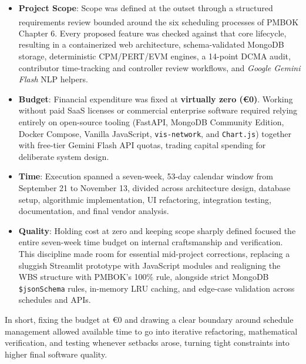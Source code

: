 \vspace{-8pt}
\begin{itemize}[itemsep=1pt,topsep=0pt,parsep=0pt,partopsep=0pt]
    \item \textbf{Project Scope}: Scope was defined at the outset through a structured requirements review bounded around the six scheduling processes of PMBOK\textsuperscript{\textregistered} Chapter 6. Every proposed feature was checked against that core lifecycle, resulting in a containerized web architecture, schema-validated MongoDB storage, deterministic CPM/PERT/EVM engines, a 14-point DCMA audit, contributor time-tracking and controller review workflows, and \textit{Google Gemini Flash} NLP helpers. 
    \item \textbf{Budget}: Financial expenditure was fixed at \textbf{virtually zero (€0)}. Working without paid SaaS licenses or commercial enterprise software required relying entirely on open-source tooling (FastAPI, MongoDB Community Edition, Docker Compose, Vanilla JavaScript, \texttt{vis-network}, and \texttt{Chart.js}) together with free-tier Gemini Flash API quotas, trading capital spending for deliberate system design.
    \item \textbf{Time}: Execution spanned a seven-week, 53-day calendar window from September 21 to November 13, divided across architecture design, database setup, algorithmic implementation, UI refactoring, integration testing, documentation, and final vendor analysis. 
    \item \textbf{Quality}: Holding cost at zero and keeping scope sharply defined focused the entire seven-week time budget on internal craftsmanship and verification. This discipline made room for essential mid-project corrections, replacing a sluggish Streamlit prototype with JavaScript modules and realigning the WBS structure with PMBOK's 100\% rule, alongside strict MongoDB \texttt{\$jsonSchema} rules, in-memory LRU caching, and edge-case validation across schedules and APIs. 
\end{itemize}

\vspace{2mm}

In short, fixing the budget at €0 and drawing a clear boundary around schedule management allowed available time to go into iterative refactoring, mathematical verification, and testing whenever setbacks arose, turning tight constraints into higher final software quality.

\newpage

